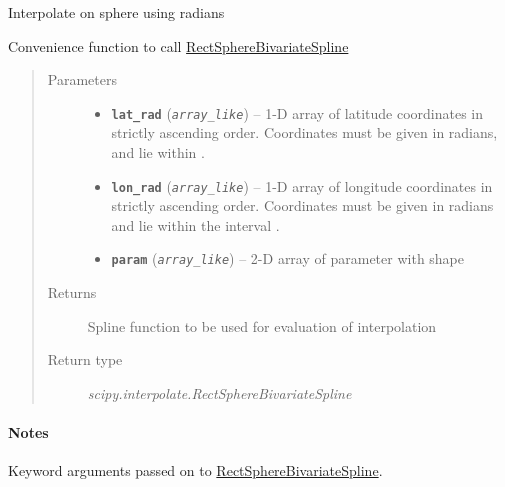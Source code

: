 \documentclass[letterpaper,10pt,english]{sphinxhowto}
\begin{document}
\begin{fulllineitems}
\label{swtools_doc:swtools.interpolate2d_sphere}
Interpolate on sphere using radians

Convenience function to call \href{http://docs.scipy.org/doc/scipy/reference/generated/scipy.interpolate.RectSphereBivariateSpline.html}{RectSphereBivariateSpline}
\begin{quote}\begin{description}
\item[{Parameters}] \leavevmode\begin{itemize}
\item {} 
\textbf{\texttt{lat\_rad}} (\emph{\texttt{array\_like}}) -- 1-D array of latitude coordinates in strictly ascending order.
Coordinates must be given in radians, and lie within .

\item {} 
\textbf{\texttt{lon\_rad}} (\emph{\texttt{array\_like}}) -- 1-D array of longitude coordinates in strictly ascending order.
Coordinates must be given in radians and lie within the interval
.

\item {} 
\textbf{\texttt{param}} (\emph{\texttt{array\_like}}) -- 2-D array of parameter with shape 

\end{itemize}

\item[{Returns}] \leavevmode
Spline function to be used for evaluation of interpolation

\item[{Return type}] \leavevmode
\emph{scipy.interpolate.RectSphereBivariateSpline}

\end{description}\end{quote}
\paragraph{Notes}

Keyword arguments passed on to \href{http://docs.scipy.org/doc/scipy/reference/generated/scipy.interpolate.RectSphereBivariateSpline.html}{RectSphereBivariateSpline}.

\end{fulllineitems}
\end{document}
